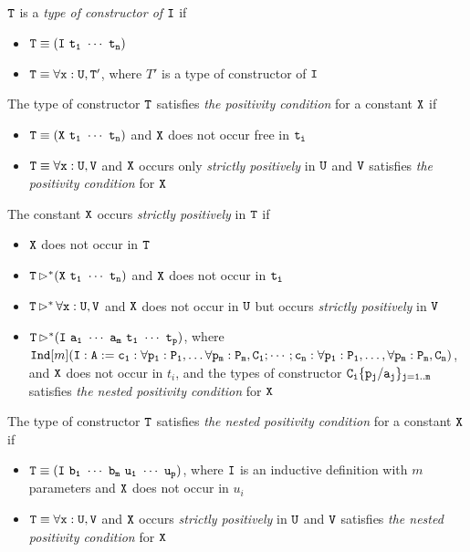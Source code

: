 \begin{Def}[Constructor] 
$\tt T$ is a \textit{type of constructor of }$\tt I$ if
    \begin{itemize}\normalfont
        \item $\tt T\equiv(\tt I\ t_1\ \cdots\ t_n)$
        \item $\tt T\equiv\forall x:U,T'$, where $T'$ is a type of constructor of $\tt I$ 
    \end{itemize}
\end{Def}

\begin{Def}[Positivity]
The type of constructor $\tt T$ satisfies \textit{the positivity condition} for a constant $\tt X$ if
    \begin{itemize}\normalfont
        \item $\tt T\equiv (X\ t_1\ \cdots\ t_n)$ and $\tt X$ does not occur free in $\tt t_i$
        \item $\tt T\equiv \forall x:U,V$ and $\tt X$ occurs only \textit{strictly positively} in $\tt U$ and 
            $\tt V$ satisfies \textit{the positivity condition} for $\tt X$
    \end{itemize}
\end{Def}

\begin{Def}
The constant $\tt X$ occurs \textit{strictly positively} in $\tt T$ if 
    \begin{itemize}\normalfont
        \item $\tt X$ does not occur in $\tt T$
        \item $\tt T\mathop{\rhd}^*\tt (X\ t_1\ \cdots\ t_n)$ and $\tt X$ does not occur in $\tt t_i$
        \item $\tt T\mathop{\rhd}^*\tt \forall x:U,V$ and $\tt X$ does not occur in $\tt U$ but occurs
            \textit{strictly positively} in $\tt V$
        \item $\tt T\mathop{\rhd}^*\tt (I\ a_1\ \cdots\ a_m\ t_1\ \cdots\ t_p)$, where 
            ${\tt Ind}[m](\tt I:A:=c_1:\forall p_1:P_1,\dots\forall p_m:P_m,C_1;\cdots;c_n:\forall p_1:P_1,\dots,
            \forall p_m:P_m,C_n)$, and $\tt X$ does not occur in $t_i$, and the types of constructor 
            $\tt C_i\{p_j/a_j\}_{j=1..m}$ satisfies \textit{the nested positivity condition} for $\tt X$ 
    \end{itemize}
\end{Def}

\begin{Def}
The type of constructor $\tt T$ satisfies \textit{the nested positivity condition} for a constant $\tt X$ if
    \begin{itemize}\normalfont
        \item $\tt T\equiv(I\ b_1\ \cdots\ b_m\ u_1\ \cdots\ u_p)$, where $\tt I$ is an inductive definition with $m$
            parameters and $\tt X$ does not occur in $u_i$
        \item $\tt T\equiv\forall x:U,V$ and $\tt X$ occurs \textit{strictly positively} in $\tt U$ and $\tt V$
            satisfies \textit{the nested positivity condition} for $\tt X$
    \end{itemize}
\end{Def}

